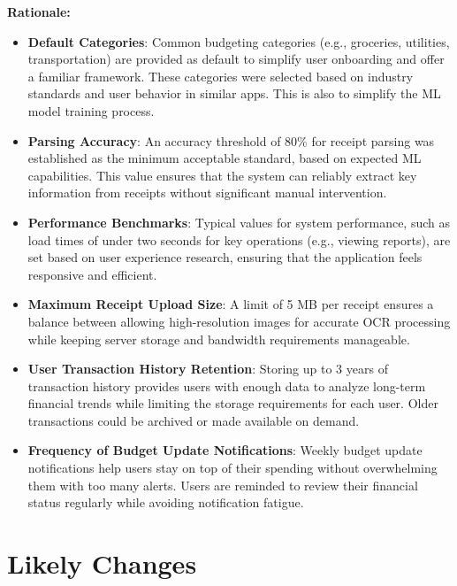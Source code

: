\documentclass[12pt]{article}
\begin{document}
\noindent\textbf{Rationale:}
\begin{itemize}
    \item \textbf{Default Categories}: Common budgeting categories (e.g.,
    groceries, utilities, transportation) are provided as default to simplify
    user onboarding and offer a familiar framework. These categories were
    selected based on industry standards and user behavior in similar apps. This
    is also to simplify the ML model training process.
    \item \textbf{Parsing Accuracy}: An accuracy threshold of 80\% for receipt
    parsing was established as the minimum acceptable standard, based on
    expected ML capabilities. This value ensures that the system can reliably
    extract key information from receipts without significant manual
    intervention.
    \item \textbf{Performance Benchmarks}: Typical values for system
    performance, such as load times of under two seconds for key operations
    (e.g., viewing reports), are set based on user experience research, ensuring
    that the application feels responsive and efficient.
    \item \textbf{Maximum Receipt Upload Size}: A limit of 5 MB per receipt
    ensures a balance between allowing high-resolution images for accurate OCR
    processing while keeping server storage and bandwidth requirements
    manageable. 
    \item \textbf{User Transaction History Retention}: Storing up to 3 years of
    transaction history provides users with enough data to analyze long-term
    financial trends while limiting the storage requirements for each user.
    Older transactions could be archived or made available on demand.
    \item \textbf{Frequency of Budget Update Notifications}: Weekly budget
    update notifications help users stay on top of their spending without
    overwhelming them with too many alerts. Users are reminded to review their
    financial status regularly while avoiding notification fatigue.
\end{itemize}

\newpage 

\section{Likely Changes}    
\end{document}
